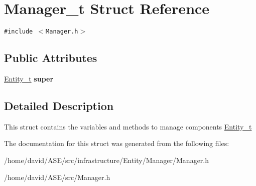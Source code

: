 \hypertarget{structManager__t}{
\section{Manager\_\-t Struct Reference}
\label{structManager__t}
}
{\tt \#include $<$Manager.h$>$}

\subsection*{Public Attributes}
\begin{CompactItemize}
\item 
\hypertarget{structManager__t_1e4ca325fcfbbf1699583e7cc807106a}{
\hyperlink{structEntity__t}{Entity\_\-t} \textbf{super}}
\label{structManager__t_1e4ca325fcfbbf1699583e7cc807106a}

\end{CompactItemize}


\subsection{Detailed Description}
This struct contains the variables and methods to manage components  \hyperlink{structEntity__t}{Entity\_\-t} 

The documentation for this struct was generated from the following files:\begin{CompactItemize}
\item 
/home/david/ASE/src/infrastructure/Entity/Manager/Manager.h\item 
/home/david/ASE/src/Manager.h\end{CompactItemize}

